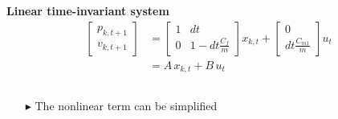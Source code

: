 \documentclass[9pt, aspectratio=169]{beamer}
\begin{document}
\begin{frame}[t]
\begin{columns}
\begin{column}{0.6\textwidth}
 \hspace{2.5cm}\textbf{Linear time-invariant system}
\begin{equation*}
    \begin{aligned}
    		\begin{bmatrix}
    			p_{k,t+1} \\
    			v_{k,t+1}
    		\end{bmatrix}
    		& =
    		\begin{bmatrix}
    			1 & dt \\
    			0 & 1-dt\frac{C_f}{m}
    		\end{bmatrix}
    		x_{k,t}
    		+
    		\begin{bmatrix}
    			0 \\
    			dt \frac{C_{m1}}{m}
    		\end{bmatrix}
    		u_t \\
    		& = A \, x_{k,t} + B \, u_t
    \end{aligned}
\end{equation*}
\end{column}
\end{columns}
\begin{columns}
\begin{column}{0.4\textwidth}
\vspace{-0.4cm}
 \begin{block}{}
\centering
{} \begin{itemize}
	\footnotesize
	\item[$\blacktriangleright$] The nonlinear term can be simplified
\end{itemize}
\end{block}
\end{column}
\begin{column}{0.49\textwidth}
\end{column}
\end{columns}
\end{frame}
\end{document}
